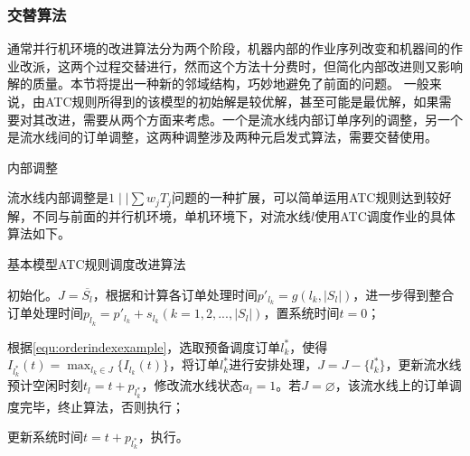 \subsubsection{交替算法}
通常并行机环境的改进算法分为两个阶段，机器内部的作业序列改变和机器间的作业改派，这两个过程交替进行\cite{史烨2011}，然而这个方法十分费时，但简化内部改进则又影响解的质量。本节将提出一种新的邻域结构，巧妙地避免了前面的问题。
一般来说，由ATC规则所得到的该模型的初始解是较优解，甚至可能是最优解，如果需要对其改进，需要从两个方面来考虑。一个是流水线内部订单序列的调整，另一个是流水线间的订单调整，这两种调整涉及两种元启发式算法，需要交替使用。
\begin{asparaenum}
\item 内部调整

流水线内部调整是$1\mid\mid \sum w_jT_j$问题的一种扩展，可以简单运用ATC规则达到较好解，不同与前面的并行机环境，单机环境下，对流水线$l$使用ATC调度作业的具体算法如下。

\begin{algori}
基本模型ATC规则调度改进算法
\begin{asparaenum}
\renewcommand{\labelenumi}{\bf Step\theenumi~}
\item 初始化。$J = \overline{S_l}$，根据和计算各订单处理时间$p'_{l_k} = g({l_k}, |S_l|)$，进一步得到整合订单处理时间$p_{l_k} = p'_{l_k} + s_{l_k}(k = 1,2,...,|S_l|)$，置系统时间$t = 0$；
\item 根据\eqref{equ:orderindexexample}，选取预备调度订单$l_k^*$，使得$I_{l_k^*}(t) = \displaystyle\max_{l_k\in J}\{I_{l_k}(t)\}$，将订单$l_k^*$进行安排处理，$J = J -\{l_k^*\}$，更新流水线预计空闲时刻$t_{l} = t + p_{l_k^*}$，修改流水线状态$a_{l} = 1$。若$J = \varnothing$，该流水线上的订单调度完毕，终止算法，否则执行；
\item 更新系统时间$t = t + p_{l_k^*}$，执行。
\end{asparaenum}
\end{algori}


\end{asparaenum}
